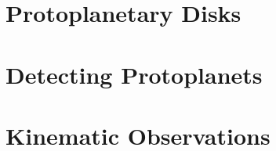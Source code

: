 \section{Protoplanetary Disks}

\section{Detecting Protoplanets}

\section{Kinematic Observations}

